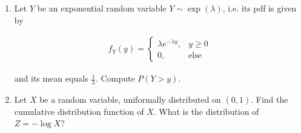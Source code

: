 
\begin{exercise}

\begin{enumerate}

    \item Let $Y$ be an exponential random variable $Y \sim \exp(\lambda)$, i.e. its pdf is given by
    
    \begin{align*}
        f_Y(y)
        =
        \begin{cases}
            \lambda e^{-\lambda y}, & y \geq 0 \\
            0,                      & \text{else}
        \end{cases}
    \end{align*}

    and its mean equals $\frac{1}{\lambda}$.
    Compute $P(Y > y)$.

    \item Let $X$ be a random variable, uniformally distributed on $(0, 1)$.
    Find the cumulative distribution function of $X$.
    What is the distribution of $Z = -\log X$?

\end{enumerate}

\end{exercise}


